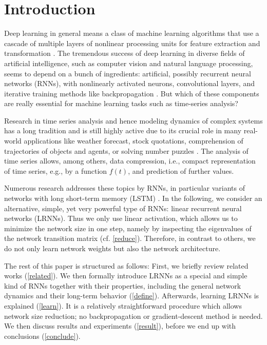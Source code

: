 \documentclass[twoside,11pt]{article}
\theoremstyle{definition}
\begin{document}
\section{Introduction}

Deep learning in general means a class of machine learning algorithms that use a
cascade of multiple layers of nonlinear processing units for feature extraction
and transformation \citep{DY14}. The tremendous success of deep learning in
diverse fields of artificial intelligence, such as computer vision and natural
language processing, seems to depend on a bunch of ingredients: artificial,
possibly recurrent neural networks (RNNs), with nonlinearly activated neurons,
convolutional layers, and iterative training methods like backpropagation
\citep{GBC16}. But which of these components are really essential for machine
learning tasks such as time-series analysis?

Research in time series analysis and hence modeling dynamics of complex systems
has a long tradition and is still highly active due to its crucial role in many
real-world applications \citep{LBE15} like weather forecast, stock quotations,
comprehension of trajectories of objects and agents, or solving number puzzles
\citep{RK11,GW13}. The analysis of time series allows, among others, data
compression, i.e., compact representation of time series, e.g., by a function
$f(t)$, and prediction of further values.

Numerous research addresses these topics by RNNs, in particular variants of
networks with long short-term memory (LSTM) \citep{HS97}. In the following, we
consider an alternative, simple, yet very powerful type of RNNs: linear
recurrent neural networks (LRNNs). Thus we only use linear activation, which
allows us to minimize the network size in one step, namely by inspecting the
eigenvalues of the network transition matrix (cf. \cref{reduce}). Therefore, in
contrast to others, we do not only learn network weights but also the
network architecture.

The rest of this paper is structured as follows: First, we briefly review related
works (\cref{related}). We then formally introduce LRNNs as a special and simple
kind of RNNs together with their properties, including the general network
dynamics and their long-term behavior (\cref{define}). Afterwards, learning
LRNNs is explained (\cref{learn}). It is a relatively straightforward procedure
which allows network size reduction; no backpropagation or gradient-descent
method is needed. We then discuss results and experiments (\cref{result}),
before we end up with conclusions (\cref{conclude}).
\end{document}
